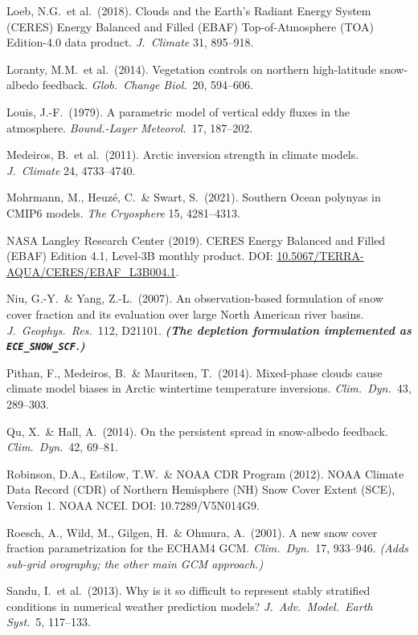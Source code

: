 \documentclass[10pt]{article}
\begin{document}
{Loeb, N.G.\ et al.\ (2018). Clouds and the Earth's Radiant Energy System (CERES) Energy Balanced and Filled
(EBAF) Top-of-Atmosphere (TOA) Edition-4.0 data product. \emph{J.\ Climate} 31, 895--918.\par
Loranty, M.M.\ et al.\ (2014). Vegetation controls on northern high-latitude snow-albedo feedback. \emph{Glob.\
Change Biol.}\ 20, 594--606.\par
Louis, J.-F.\ (1979). A parametric model of vertical eddy fluxes in the atmosphere. \emph{Bound.-Layer Meteorol.}\
17, 187--202.\par
Medeiros, B.\ et al.\ (2011). Arctic inversion strength in climate models. \emph{J.\ Climate} 24, 4733--4740.\par
Mohrmann, M., Heuz\'e, C.\ \& Swart, S.\ (2021). Southern Ocean polynyas in CMIP6 models. \emph{The Cryosphere} 15,
4281--4313.\par
NASA Langley Research Center (2019). CERES Energy Balanced and Filled (EBAF) Edition 4.1,
Level-3B monthly product. DOI:
\href{https://doi.org/10.5067/TERRA-AQUA/CERES/EBAF_L3B004.1}
{10.5067/TERRA-AQUA/CERES/EBAF\_L3B004.1}.\par
Niu, G.-Y.\ \& Yang, Z.-L.\ (2007). An observation-based formulation of snow cover fraction and its evaluation
over large North American river basins. \emph{J.\ Geophys.\ Res.}\ 112, D21101.
\textbf{\emph{(The depletion formulation implemented as \texttt{ECE\_SNOW\_SCF}.)}}\par
Pithan, F., Medeiros, B.\ \& Mauritsen, T.\ (2014). Mixed-phase clouds cause climate model biases in Arctic
wintertime temperature inversions. \emph{Clim.\ Dyn.}\ 43, 289--303.\par
Qu, X.\ \& Hall, A.\ (2014). On the persistent spread in snow-albedo feedback. \emph{Clim.\ Dyn.}\ 42,
69--81.\par
Robinson, D.A., Estilow, T.W.\ \& NOAA CDR Program (2012). NOAA Climate Data Record (CDR) of Northern Hemisphere
(NH) Snow Cover Extent (SCE), Version 1. NOAA NCEI. DOI: 10.7289/V5N014G9.\par
Roesch, A., Wild, M., Gilgen, H.\ \& Ohmura, A.\ (2001). A new snow cover fraction parametrization for the
ECHAM4 GCM. \emph{Clim.\ Dyn.}\ 17, 933--946. \emph{(Adds sub-grid orography; the other main GCM approach.)}\par
Sandu, I.\ et al.\ (2013). Why is it so difficult to represent stably stratified conditions in numerical weather
prediction models? \emph{J.\ Adv.\ Model.\ Earth Syst.}\ 5, 117--133.\par
}
\end{document}
